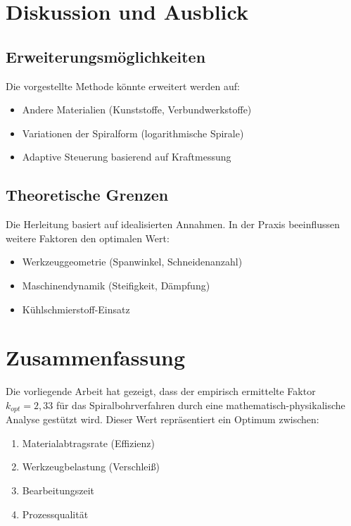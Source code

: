﻿\documentclass[12pt,a4paper]{article}
\begin{document}
\section{Diskussion und Ausblick}

\subsection{Erweiterungsmöglichkeiten}

Die vorgestellte Methode könnte erweitert werden auf:
\begin{itemize}
	\item Andere Materialien (Kunststoffe, Verbundwerkstoffe)
	\item Variationen der Spiralform (logarithmische Spirale)
	\item Adaptive Steuerung basierend auf Kraftmessung
\end{itemize}

\subsection{Theoretische Grenzen}

Die Herleitung basiert auf idealisierten Annahmen. In der Praxis beeinflussen weitere Faktoren den optimalen Wert:
\begin{itemize}
	\item Werkzeuggeometrie (Spanwinkel, Schneidenanzahl)
	\item Maschinendynamik (Steifigkeit, Dämpfung)
	\item Kühlschmierstoff-Einsatz
\end{itemize}

\section{Zusammenfassung}

Die vorliegende Arbeit hat gezeigt, dass der empirisch ermittelte Faktor $k_{opt} = 2{,}33$ für das Spiralbohrverfahren durch eine mathematisch-physikalische Analyse gestützt wird. Dieser Wert repräsentiert ein Optimum zwischen:

\begin{enumerate}
	\item Materialabtragsrate (Effizienz)
	\item Werkzeugbelastung (Verschleiß)
	\item Bearbeitungszeit
	\item Prozessqualität
\end{enumerate}
\end{document}
